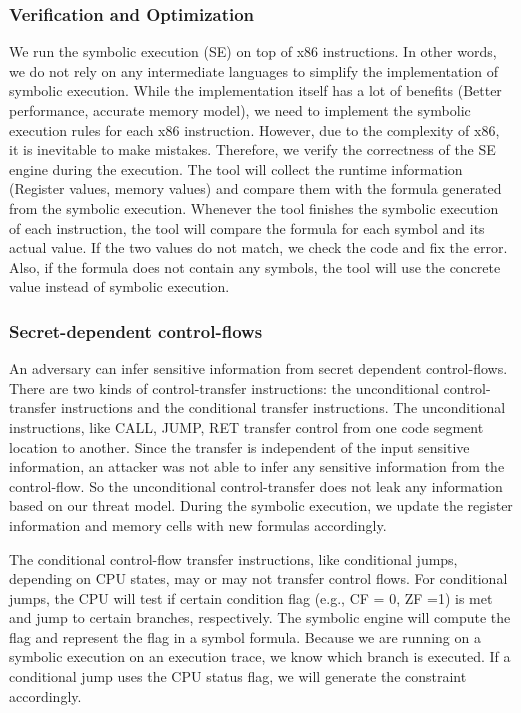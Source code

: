 \subsubsection{Verification and Optimization}
We run the symbolic execution (SE) on top of x86 instructions. In other words, we do not rely on any intermediate languages to simplify the implementation of symbolic execution. While the implementation itself has a lot of benefits (Better performance, accurate memory model), we need to implement the symbolic execution rules for each x86 instruction. 
However, due to the complexity of x86, it is inevitable to make mistakes. Therefore, we verify the correctness of the SE engine during the execution. 
The tool will collect the runtime information (Register values, memory values) and compare them with the formula generated from the symbolic execution. Whenever the tool finishes the symbolic execution of each instruction, the tool will compare the formula for each symbol and its actual value. If the two values do not match, we check the code and fix the error. Also, if the formula does not contain any symbols, the tool will use the concrete value instead of symbolic execution.

\subsubsection{Secret-dependent control-flows}
An adversary can infer sensitive information from secret dependent control-flows. There are two kinds of control-transfer instructions: the unconditional control-transfer instructions and the conditional transfer instructions.
The unconditional instructions, like CALL, JUMP, RET transfer control from one code segment location to another. Since the transfer is independent of the input sensitive information, an attacker was not able to infer any sensitive information from the control-flow. 
So the unconditional control-transfer does not leak any information based on our threat model. During the symbolic execution, we update the register information and memory cells with new formulas accordingly.

The conditional control-flow transfer instructions, like conditional jumps, depending on CPU states, may or may not transfer control flows. For conditional jumps, the CPU will test if certain condition flag 
(e.g., CF = 0, ZF =1) is met and jump to certain branches, respectively.
The symbolic engine will compute the flag and represent the flag in a symbol 
formula. Because we are running on a symbolic execution on an execution trace, we know which branch is executed.
If a conditional jump uses the CPU status flag, we will generate the constraint accordingly.

